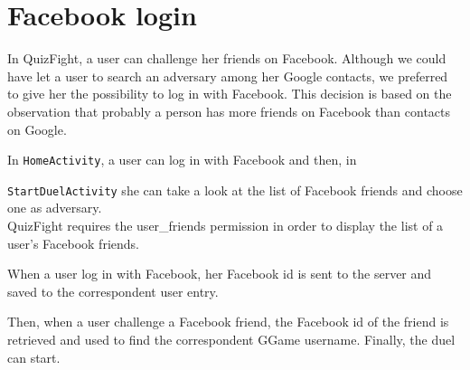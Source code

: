 \section{Facebook login}\label{sec:fb}

In QuizFight, a user can challenge her friends on Facebook.
Although we could have let a user to search an adversary among her Google
contacts, we preferred to give her the possibility to log in with Facebook.
This decision is based on the observation that probably a person has more
friends on Facebook than contacts on Google.

In \texttt{HomeActivity}, a user can log in with Facebook and then, in

\texttt{StartDuelActivity} she can take a look at the list of
Facebook friends and choose one as adversary. \\

QuizFight requires the user\_friends permission in order to display the
list of a user's Facebook friends.

When a user log in with Facebook, her Facebook id is sent to the server and
saved to the correspondent user entry.

Then, when a user challenge a Facebook friend, the Facebook id of the friend
is retrieved and used to find the correspondent GGame username.
Finally, the duel can start.
